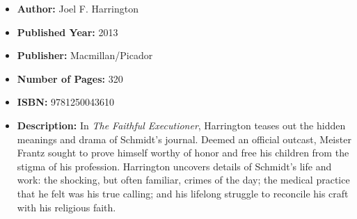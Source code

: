 \documentclass{tufte-handout}
\begin{document}
\begin{itemize}
    \item[] \textbf{Author:} Joel F. Harrington
    \item[] \textbf{Published Year:} 2013
    \item[] \textbf{Publisher:} Macmillan/Picador
    \item[] \textbf{Number of Pages:} 320 
    \item[] \textbf{ISBN:} 9781250043610
    \item[] \textbf{Description:} In \textit{The Faithful Executioner}, Harrington teases out the hidden meanings and drama of Schmidt's journal. Deemed an official outcast, Meister Frantz sought to prove himself worthy of honor and free his children from the stigma of his profession. Harrington uncovers details of Schmidt's life and work: the shocking, but often familiar, crimes of the day; the medical practice that he felt was his true calling; and his lifelong struggle to reconcile his craft with his religious faith.
\end{itemize}
\end{document}
